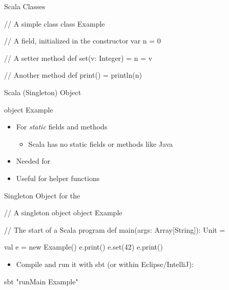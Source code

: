 \begin{frame}[fragile]{Scala Classes}
\begin{chisel}
// A simple class
class Example {
  // A field, initialized in the constructor
  var n = 0
  
  // A setter method
  def set(v: Integer) = {
    n = v
  }
  
  // Another method
  def print() = {
    println(n)
  }
}
\end{chisel}
\end{frame}

\begin{frame}[fragile]{Scala (Singleton) Object}
\begin{chisel}
object Example {}
\end{chisel}
\begin{itemize}
\item For \emph{static} fields and methods
\begin{itemize}
\item Scala has no static fields or methods like Java
\end{itemize}
\item Needed for 
\item Useful for helper functions
\end{itemize}
\end{frame}

\begin{frame}[fragile]{Singleton Object for the }
\begin{chisel}
// A singleton object
object Example {
  
  // The start of a Scala program
  def main(args: Array[String]): Unit = {
    
    val e = new Example()
    e.print()
    e.set(42)
    e.print()
  }
}
\end{chisel}
\begin{itemize}
\item Compile and run it with sbt (or within Eclipse/IntelliJ):
\end{itemize}
\begin{chisel}
sbt "runMain Example"
\end{chisel}
\end{frame}







